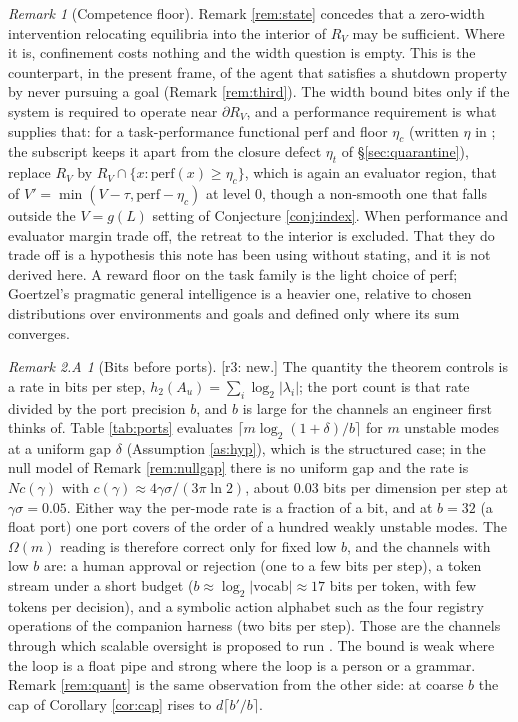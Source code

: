 \documentclass[11pt]{article}
\theoremstyle{definition}
\theoremstyle{remark}
\newtheorem{remark}{Remark}[section]
\newtheorem*{remtwoA}{Remark 2.A}
\newcommand{\RV}{R_V}
\newcommand{\Au}{A_u}
\newcommand{\htwo}{h_2}
\newcommand{\revnote}[1]{\textcolor{red!60!black}{[r3: #1]}}
\begin{document}
\begin{remark}[Competence floor]\label{rem:competence}
Remark \ref{rem:state} concedes that a zero-width intervention relocating equilibria into the interior of $\RV$ may be sufficient. Where it is, confinement costs nothing and the width question is empty. This is the counterpart, in the present frame, of the agent that satisfies a shutdown property by never pursuing a goal (Remark \ref{rem:third}). The width bound bites only if the system is required to operate near $\partial\RV$, and a performance requirement is what supplies that: for a task-performance functional $\mathrm{perf}$ and floor $\eta_c$ (written $\eta$ in \cite{dugan2025frc}; the subscript keeps it apart from the closure defect $\eta_t$ of \S\ref{sec:quarantine}), replace $\RV$ by $\RV\cap\{x:\mathrm{perf}(x)\ge\eta_c\}$, which is again an evaluator region, that of $V'=\min(V-\tau,\mathrm{perf}-\eta_c)$ at level $0$, though a non-smooth one that falls outside the $V=g(L)$ setting of Conjecture \ref{conj:index}. When performance and evaluator margin trade off, the retreat to the interior is excluded. That they do trade off is a hypothesis this note has been using without stating, and it is not derived here. A reward floor on the task family is the light choice of $\mathrm{perf}$; Goertzel's pragmatic general intelligence \cite{goertzel2010} is a heavier one, relative to chosen distributions over environments and goals and defined only where its sum converges.
\end{remark}

\begin{remtwoA}[Bits before ports]
\revnote{new.} The quantity the theorem controls is a rate in bits per step, $\htwo(\Au)=\sum_i\log_2|\lambda_i|$; the port count is that rate divided by the port precision $b$, and $b$ is large for the channels an engineer first thinks of. Table \ref{tab:ports} evaluates $\lceil m\log_2(1+\delta)/b\rceil$ for $m$ unstable modes at a uniform gap $\delta$ (Assumption \ref{as:hyp}), which is the structured case; in the null model of Remark \ref{rem:nullgap} there is no uniform gap and the rate is $N c(\gamma)$ with $c(\gamma)\approx4\gamma\sigma/(3\pi\ln2)$, about $0.03$ bits per dimension per step at $\gamma\sigma=0.05$. Either way the per-mode rate is a fraction of a bit, and at $b=32$ (a float port) one port covers of the order of a hundred weakly unstable modes. The $\Omega(m)$ reading is therefore correct only for fixed low $b$, and the channels with low $b$ are: a human approval or rejection (one to a few bits per step), a token stream under a short budget ($b\approx\log_2|\text{vocab}|\approx17$ bits per token, with few tokens per decision), and a symbolic action alphabet such as the four registry operations of the companion harness \cite{dugan2026harness} (two bits per step). Those are the channels through which scalable oversight is proposed to run \cite{christiano2018,bowman2022,burns2023}. The bound is weak where the loop is a float pipe and strong where the loop is a person or a grammar. Remark \ref{rem:quant} is the same observation from the other side: at coarse $b$ the cap of Corollary \ref{cor:cap} rises to $d\lceil b'/b\rceil$.
\end{remtwoA}
\end{document}
